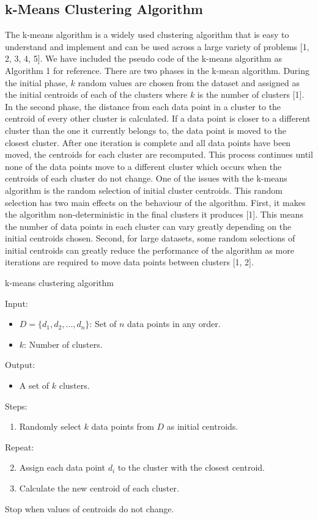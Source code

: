 \documentclass[conference,compsoc]{IEEEtran}
\begin{document}
\subsection{k-Means Clustering Algorithm}

The k-means algorithm is a widely used clustering algorithm that is easy to understand and implement and can be used across a large variety of problems [1, 2, 3, 4, 5]. We have included the pseudo code of the k-means algorithm as Algorithm 1 for reference. There are two phases in the k-mean algorithm. During the initial phase, $k$ random values are chosen from the dataset and assigned as the initial centroids of each of the clusters where $k$ is the number of clusters [1]. In the second phase, the distance from each data point in a cluster to the centroid of every other cluster is calculated. If a data point is closer to a different cluster than the one it currently belongs to, the data point is moved to the closest cluster. After one iteration is complete and all data points have been moved, the centroids for each cluster are recomputed. This process continues until none of the data points move to a different cluster which occurs when the centroids of each cluster do not change. One of the issues with the k-means algorithm is the random selection of initial cluster centroids. This random selection has two main effects on the behaviour of the algorithm. First, it makes the algorithm non-deterministic in the final clusters it produces [1]. This means the number of data points in each cluster can vary greatly depending on the initial centroids chosen. Second, for large datasets, some random selections of initial centroids can greatly reduce the performance of the algorithm as more iterations are required to move data points between clusters [1, 2].

\begin{algorithm}
    \caption{k-means clustering algorithm}
    Input:
        \begin{itemize}
            \item $D = \{d_1, d_2, \dots, d_n\}$: Set of $n$ data points in any order.
            \item $k$: Number of clusters.
        \end{itemize}
    Output:
        \begin{itemize}
            \item A set of $k$ clusters.
        \end{itemize}
    Steps:
        \begin{enumerate}
            \item Randomly select $k$ data points from $D$ as initial centroids.
        \end{enumerate}
        Repeat:
        \begin{enumerate}
        \setcounter{enumi}{1}
            \item Assign each data point $d_i$ to the cluster with the closest centroid.
            \item Calculate the new centroid of each cluster.
        \end{enumerate}
        Stop when values of centroids do not change.
\end{algorithm}
\end{document}
